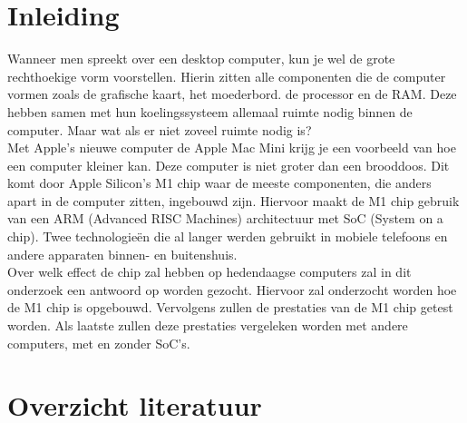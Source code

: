 \documentclass{hogent-article}
\affiliation{
    \textsuperscript{1} \href{mailto:jona.deneve.@student.hogent.be}{jona.deneve.@student.hogent.be}
}
\begin{document}
\flushbottom %
\maketitle %
    \tableofcontents %
\thispagestyle{empty} %


\section{Inleiding}


Wanneer men spreekt over een desktop computer, kun je wel de grote rechthoekige vorm voorstellen. Hierin zitten alle componenten die de computer vormen zoals de grafische kaart, het moederbord. de processor en de RAM. Deze hebben samen met hun koelingssysteem allemaal ruimte nodig binnen de computer. Maar wat als er niet zoveel ruimte nodig is? \\
Met Apple's nieuwe computer de Apple Mac Mini krijg je een voorbeeld van hoe een computer kleiner kan. Deze computer is niet groter dan een brooddoos. Dit komt door Apple Silicon's M1 chip waar de meeste componenten, die anders apart in de computer zitten, ingebouwd zijn. Hiervoor maakt de M1 chip gebruik van een ARM (Advanced RISC Machines) architectuur met SoC (System on a chip). Twee technologieën die al langer werden gebruikt in mobiele telefoons en andere apparaten binnen- en buitenshuis. \\
Over welk effect de chip zal hebben op hedendaagse computers zal in dit onderzoek een antwoord op worden gezocht. Hiervoor zal onderzocht worden hoe de M1 chip is opgebouwd. Vervolgens zullen de prestaties van de M1 chip getest worden. Als laatste zullen deze prestaties vergeleken worden met andere computers, met en zonder SoC's.

\section{Overzicht literatuur}
\end{document}
